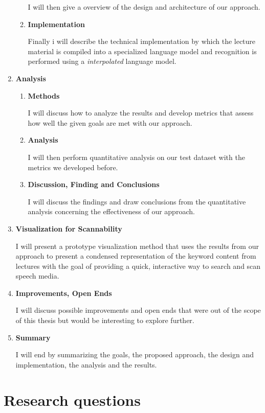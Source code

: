\documentclass[]{article}
\begin{document}
\begin{enumerate}
\begin{enumerate}
    I will then give a overview of the design and architecture of our
    approach.
  \item
    \textbf{Implementation}

    Finally i will describe the technical implementation by which the
    lecture material is compiled into a specialized language model and
    recognition is performed using a \emph{interpolated} language model.
  \end{enumerate}
\item
  \textbf{Analysis}

  \begin{enumerate}
  \item
    \textbf{Methods}

    I will discuss how to analyze the results and develop metrics that
    assess how well the given goals are met with our approach. 
  \item
    \textbf{Analysis}

    I will then perform quantitative analysis on our test dataset with
    the metrics we developed before.
  \item
    \textbf{Discussion, Finding and Conclusions}

    I will discuss the findings and draw conclusions from the
    quantitative analysis concerning the effectiveness of our approach.
  \end{enumerate}
\item
  \textbf{Visualization for Scannability}

  I will present a prototype visualization method that uses the results
  from our approach to present a condensed representation of the keyword
  content from lectures with the goal of providing a quick, interactive
  way to search and scan speech media.
\item
  \textbf{Improvements, Open Ends}

  I will discuss possible improvements and open ends that were out of
  the scope of this thesis but would be interesting to explore further.
\item
  \textbf{Summary}

  I will end by summarizing the goals, the proposed approach, the design
  and implementation, the analysis and the results.
\end{enumerate}

\pagebreak

\section{Research questions}\label{research-questions}
\end{document}
